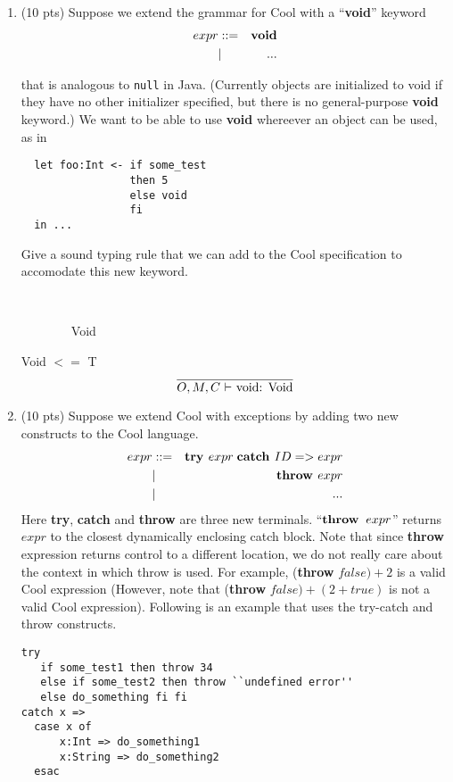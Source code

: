 \documentclass[10pt]{article}
\newcommand{\infertext}[2]{\infer{{\textrm{#1}}}{#2}}
\begin{document}
\begin{enumerate}
\



\medskip
\item (10 pts) Suppose we extend the grammar for Cool with a ``{\bf void}'' keyword
\begin{eqnarray*}
  expr & ::= & {\bf void} \\
       & |   & ...
\end{eqnarray*}

  that is analogous to {\tt null} in Java. (Currently objects are
  initialized to void if they have no other initializer specified, but
  there is no general-purpose {\bf void} keyword.)  We want to be able
  to use {\bf void} whereever an object can be used, as in
\begin{verbatim}
  let foo:Int <- if some_test
                 then 5
                 else void
                 fi
  in ...
\end{verbatim}

  Give a sound typing rule that we can add to the Cool specification
  to accomodate this new keyword.

\

\ \ \ \ \ \ \ \ Void   
\newline

Void $<=$ T
	\[\infertext
          {$O,M,C$ $\vdash$ void: Void}
          {}
        \]



\medskip
\item  (10 pts) Suppose we extend Cool with exceptions by adding two new constructs
to the Cool language.
\begin{eqnarray*}
  expr & ::= & \textit{\bf try } expr \;\textit{\bf catch } ID => expr \\
       & |   & \textit{\bf throw } expr \\
       & | & ...
\end{eqnarray*}
Here {\bf try}, {\bf catch} and {\bf throw} are three new terminals.
  ``${\bf throw }\;\; expr$'' returns $expr$ to the
  closest dynamically enclosing catch block.
Note that since {\bf throw} expression returns control to a different location, we do not really
  care about the context in which throw is used. For example,
({\bf throw} $false) + 2$ is a valid Cool expression (However, note that
  ({\bf throw} $false) + (2+true)$ is not a valid Cool expression).  Following is an example that uses the
try-catch and throw constructs.
\begin{verbatim}
try
   if some_test1 then throw 34
   else if some_test2 then throw ``undefined error''
   else do_something fi fi
catch x =>
  case x of
      x:Int => do_something1
      x:String => do_something2
  esac
\end{verbatim}


\end{enumerate}
\end{document}
